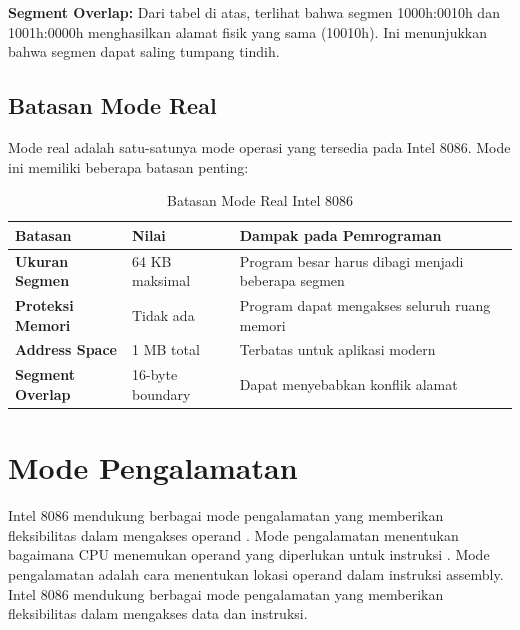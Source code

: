 \documentclass[../main.tex]{subfiles}
\begin{document}
            \textbf{Segment Overlap:}
            Dari tabel di atas, terlihat bahwa segmen 1000h:0010h dan 1001h:0000h menghasilkan alamat fisik yang sama (10010h). Ini menunjukkan bahwa segmen dapat saling tumpang tindih.

        \subsection{Batasan Mode Real}
            Mode real adalah satu-satunya mode operasi yang tersedia pada Intel 8086. Mode ini memiliki beberapa batasan penting:

            \begin{table}[H]
\centering
\caption{Batasan Mode Real Intel 8086}
\begin{tabular}{|p{3.2cm}|p{3.8cm}|p{7cm}|}
    \hline
    \textbf{Batasan} & \textbf{Nilai} & \textbf{Dampak pada Pemrograman} \\
    \hline
    \textbf{Ukuran Segmen} & 64 KB maksimal & Program besar harus dibagi menjadi beberapa segmen \\
    \hline
    \textbf{Proteksi Memori} & Tidak ada & Program dapat mengakses seluruh ruang memori \\
    \hline
    \textbf{Address Space} & 1 MB total & Terbatas untuk aplikasi modern \\
    \hline
    \textbf{Segment Overlap} & 16-byte boundary & Dapat menyebabkan konflik alamat \\
    \hline
\end{tabular}
\label{tab:real-mode-limitations}
            \end{table}

    \section{Mode Pengalamatan}

        Intel 8086 mendukung berbagai mode pengalamatan yang memberikan fleksibilitas dalam mengakses operand \cite{electronics_hub_8086_addressing}. Mode pengalamatan menentukan bagaimana CPU menemukan operand yang diperlukan untuk instruksi \cite{8086_instruction_set_reference}.
        Mode pengalamatan adalah cara menentukan lokasi operand dalam instruksi assembly. Intel 8086 mendukung berbagai mode pengalamatan yang memberikan fleksibilitas dalam mengakses data dan instruksi.
\end{document}
